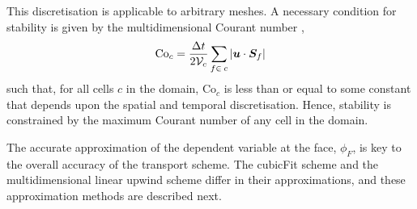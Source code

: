 This discretisation is applicable to arbitrary meshes.  A necessary condition for stability is given by the multidimensional Courant number \citep{weller-shahrokhi2014},
\begin{align}
	\mathrm{Co}_c = \frac{\Delta t}{2 \mathcal{V}_c} \sum_{f \in\: c} \left\lvert \bm{u} \cdot \bm{S}_f \right\rvert \label{eqn:co}
\end{align}
such that, for all cells $c$ in the domain, $\mathrm{Co}_c$ is less than or equal to some constant that depends upon the spatial and temporal discretisation.  Hence, stability is constrained by the maximum Courant number of any cell in the domain.

The accurate approximation of the dependent variable at the face, $\phi_F$, is key to the overall accuracy of the transport scheme. The cubicFit scheme and the multidimensional linear upwind scheme differ in their approximations, and these approximation methods are described next.

